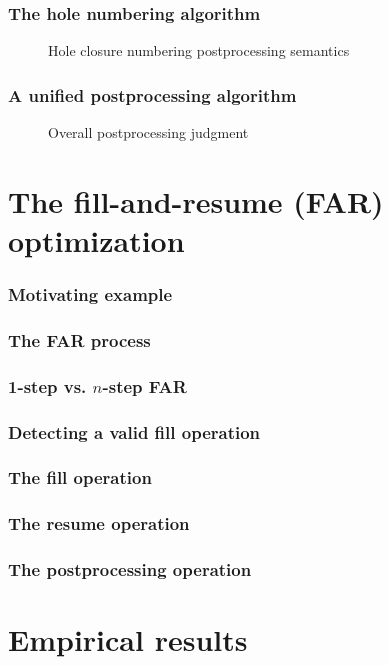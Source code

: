\documentclass{beamer}
\begin{document}
\begin{frame}
  \frametitle{The hole numbering algorithm}

  \begin{figure}
    \centering
    \tiny
    \renewcommand{\judgboxfontsize}{\tiny}
    
    \caption{Hole closure numbering postprocessing semantics}
    \label{fig:big-step-renumber-new-rules}
  \end{figure}
\end{frame}

\begin{frame}
  \frametitle{A unified postprocessing algorithm}

  \begin{figure}
    \centering
    
    \caption{Overall postprocessing judgment}
    \label{fig:big-step-postprocessing-rules}
  \end{figure}
\end{frame}

\section{The fill-and-resume (FAR) optimization}

\begin{frame}
  \frametitle{Motivating example}
\end{frame}

\begin{frame}
  \frametitle{The FAR process}
\end{frame}

\begin{frame}
  \frametitle{1-step vs. $n$-step FAR}
\end{frame}

\begin{frame}
  \frametitle{Detecting a valid fill operation}
\end{frame}

\begin{frame}
  \frametitle{The fill operation}
\end{frame}

\begin{frame}
  \frametitle{The resume operation}
\end{frame}

\begin{frame}
  \frametitle{The postprocessing operation}
\end{frame}

\section{Empirical results}
\end{document}

